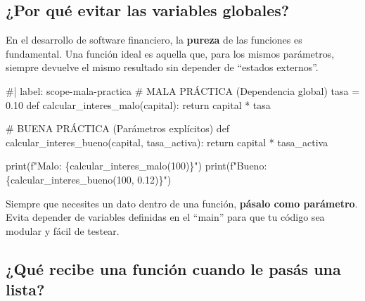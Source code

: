 \documentclass[
  spanish,
  letterpaper,
  DIV=11,
  numbers=noendperiod]{scrreprt}
\newenvironment{Shaded}{\begin{snugshade}}{\end{snugshade}}
\newcommand{\NormalTok}[1]{\textcolor[rgb]{0.00,0.23,0.31}{#1}}
\begin{document}
\subsection{¿Por qué evitar las variables
globales?}\label{por-quuxe9-evitar-las-variables-globales}

En el desarrollo de software financiero, la \textbf{pureza} de las
funciones es fundamental. Una función ideal es aquella que, para los
mismos parámetros, siempre devuelve el mismo resultado sin depender de
``estados externos''.

\begin{Shaded}
\begin{Highlighting}[]
\NormalTok{\#| label: scope{-}mala{-}practica}
\NormalTok{\# MALA PRÁCTICA (Dependencia global)}
\NormalTok{tasa = 0.10}
\NormalTok{def calcular\_interes\_malo(capital):}
\NormalTok{    return capital * tasa}

\NormalTok{\# BUENA PRÁCTICA (Parámetros explícitos)}
\NormalTok{def calcular\_interes\_bueno(capital, tasa\_activa):}
\NormalTok{    return capital * tasa\_activa}

\NormalTok{print(f"Malo: \{calcular\_interes\_malo(100)\}")}
\NormalTok{print(f"Bueno: \{calcular\_interes\_bueno(100, 0.12)\}")}
\end{Highlighting}
\end{Shaded}

\begin{tcolorbox}[enhanced jigsaw, bottomrule=.15mm, colback=white, opacitybacktitle=0.6, arc=.35mm, toprule=.15mm, opacityback=0, breakable, titlerule=0mm, left=2mm, coltitle=black, colbacktitle=quarto-callout-important-color!10!white, colframe=quarto-callout-important-color-frame, leftrule=.75mm, toptitle=1mm, bottomtitle=1mm, title=\textcolor{quarto-callout-important-color}{\faExclamation}\hspace{0.5em}{Regla de Oro}, rightrule=.15mm]

Siempre que necesites un dato dentro de una función, \textbf{pásalo como
parámetro}. Evita depender de variables definidas en el ``main'' para
que tu código sea modular y fácil de testear.

\end{tcolorbox}

\subsection{¿Qué recibe una función cuando le pasás una
lista?}\label{quuxe9-recibe-una-funciuxf3n-cuando-le-pasuxe1s-una-lista}
\end{document}
